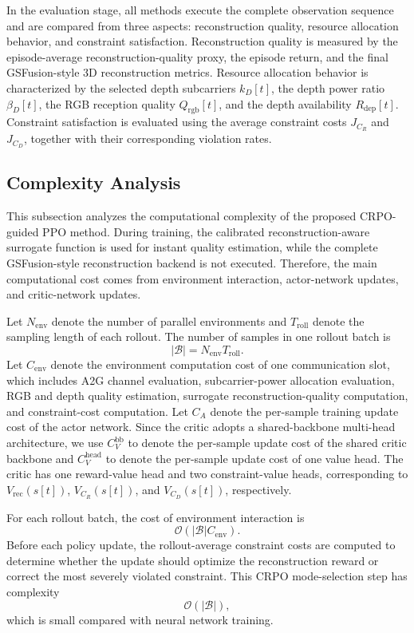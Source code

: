 \documentclass[journal]{IEEEtran}
\begin{document}
In the evaluation stage, all methods execute the complete observation sequence and are compared from three aspects: reconstruction quality, resource allocation behavior, and constraint satisfaction. 
Reconstruction quality is measured by the episode-average reconstruction-quality proxy, the episode return, and the final GSFusion-style 3D reconstruction metrics. 
Resource allocation behavior is characterized by the selected depth subcarriers $k_D[t]$, the depth power ratio $\beta_D[t]$, the RGB reception quality $Q_{\mathrm{rgb}}[t]$, and the depth availability $R_{\mathrm{dep}}[t]$. 
Constraint satisfaction is evaluated using the average constraint costs $J_{C_R}$ and $J_{C_D}$, together with their corresponding violation rates.
\subsection{Complexity Analysis}

This subsection analyzes the computational complexity of the proposed CRPO-guided PPO method. During training, the calibrated reconstruction-aware surrogate function is used for instant quality estimation, while the complete GSFusion-style reconstruction backend is not executed. Therefore, the main computational cost comes from environment interaction, actor-network updates, and critic-network updates.

Let $N_{\mathrm{env}}$ denote the number of parallel environments and $T_{\mathrm{roll}}$ denote the sampling length of each rollout. The number of samples in one rollout batch is
\begin{equation}
|\mathcal{B}|
=
N_{\mathrm{env}}T_{\mathrm{roll}}.
\end{equation}
Let $C_{\mathrm{env}}$ denote the environment computation cost of one communication slot, which includes A2G channel evaluation, subcarrier-power allocation evaluation, RGB and depth quality estimation, surrogate reconstruction-quality computation, and constraint-cost computation. Let $C_A$ denote the per-sample training update cost of the actor network. Since the critic adopts a shared-backbone multi-head architecture, we use $C_V^{\mathrm{bb}}$ to denote the per-sample update cost of the shared critic backbone and $C_V^{\mathrm{head}}$ to denote the per-sample update cost of one value head. The critic has one reward-value head and two constraint-value heads, corresponding to $V_{\mathrm{rec}}(s[t])$, $V_{C_R}(s[t])$, and $V_{C_D}(s[t])$, respectively.

For each rollout batch, the cost of environment interaction is
\begin{equation}
\mathcal{O}
\left(
|\mathcal{B}|C_{\mathrm{env}}
\right).
\end{equation}
Before each policy update, the rollout-average constraint costs are computed to determine whether the update should optimize the reconstruction reward or correct the most severely violated constraint. This CRPO mode-selection step has complexity
\begin{equation}
\mathcal{O}
\left(
|\mathcal{B}|
\right),
\end{equation}
which is small compared with neural network training.
\end{document}
